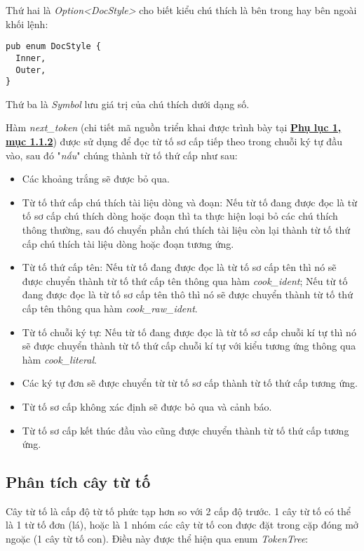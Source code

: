 \begin{itemize}
        Thứ hai là \textit{Option<DocStyle>} cho biết kiểu chú thích là bên trong hay bên ngoài khối lệnh:
\begin{lstlisting}
pub enum DocStyle {
  Inner,
  Outer,
}
\end{lstlisting}

        Thứ ba là \textit{Symbol} lưu giá trị của chú thích dưới dạng số.
\end{itemize}

Hàm \textit{next\_token} (chi tiết mã nguồn triển khai được trình bày tại \hyperref[ap1:flex_token_next_token]{\bf Phụ lục 1, mục 1.1.2}) được sử dụng để đọc từ tố sơ cấp tiếp theo trong chuỗi ký tự đầu vào, sau đó "\textit{nấu}" chúng thành từ tố thứ cấp như sau:

\begin{itemize}
  \item Các khoảng trắng sẽ được bỏ qua.
  \item Từ tố thứ cấp chú thích tài liệu dòng và đoạn: Nếu từ tố đang được đọc là từ tố sơ cấp chú thích dòng hoặc đoạn thì ta thực hiện loại bỏ các chú thích thông thường, sau đó chuyển phần chú thích tài liệu còn lại thành từ tố thứ cấp chú thích tài liệu dòng hoặc đoạn tương ứng.
  \item Từ tố thứ cấp tên: Nếu từ tố đang được đọc là từ tố sơ cấp tên thì nó sẽ được chuyển thành từ tố thứ cấp tên thông qua hàm \textit{cook\_ident}; Nếu từ tố đang được đọc là từ tố sơ cấp tên thô thì nó sẽ được chuyển thành từ tố thứ cấp tên thông qua hàm \textit{cook\_raw\_ident}.
  \item Từ tố chuỗi ký tự: Nếu từ tố đang được đọc là từ tố sơ cấp chuỗi kí tự thì nó sẽ được chuyển thành từ tố thứ cấp chuỗi kí tự với kiểu tương ứng thông qua hàm \textit{cook\_literal}.
  \item Các ký tự đơn sẽ được chuyển từ từ tố sơ cấp thành từ tố thứ cấp tương ứng.
  \item Từ tố sơ cấp không xác định sẽ được bỏ qua và cảnh báo.
  \item Từ tố sơ cấp kết thúc đầu vào cũng được chuyển thành từ tố thứ cấp tương ứng.
\end{itemize}

\subsection{Phân tích cây từ tố}
Cây từ tố là cấp độ từ tố phức tạp hơn so với 2 cấp độ trước. 1 cây từ tố có thể là 1 từ tố đơn (lá), hoặc là 1 nhóm các cây từ tố con được đặt trong cặp đóng mở ngoặc (1 cây từ tố con). Điều này được thể hiện qua enum \textit{TokenTree}:

